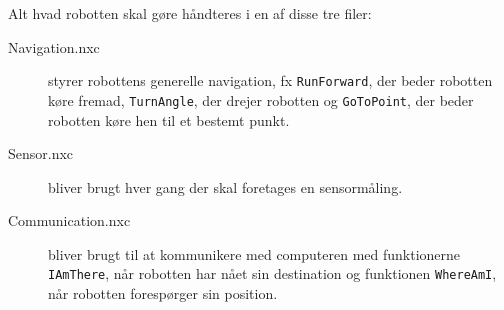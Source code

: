Alt hvad robotten skal gøre håndteres i en af disse tre filer:

\begin{description}
\item[Navigation.nxc]{styrer robottens generelle navigation, fx \lstinline[style=c]!RunForward!, der beder robotten køre fremad, \lstinline[style=c]!TurnAngle!, der drejer robotten og \lstinline[style=c]!GoToPoint!, der beder robotten køre hen til et bestemt punkt.}
\item[Sensor.nxc]{bliver brugt hver gang der skal foretages en sensormåling.}
\item[Communication.nxc]{bliver brugt til at kommunikere med computeren med funktionerne \lstinline[style=c]!IAmThere!, når robotten har nået sin destination og funktionen \lstinline[style=c]!WhereAmI!, når robotten forespørger sin position.}
\end{description}
